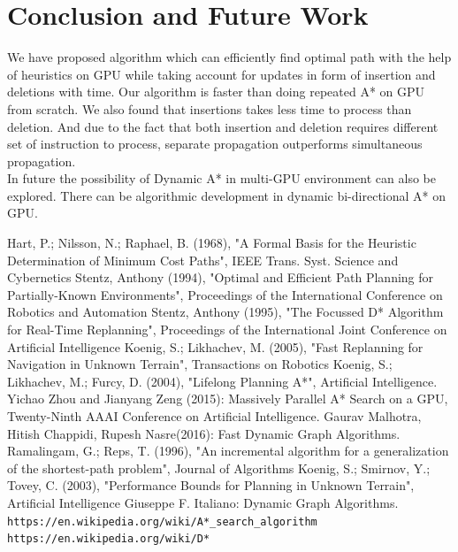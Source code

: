 \documentclass[a4paper]{article}
\begin{document}
\section{Conclusion and Future Work}
We have proposed algorithm which can efficiently find optimal path with the help of heuristics on GPU while taking account for updates in form of insertion and deletions with time. Our algorithm is faster than doing repeated A* on GPU from scratch. We also found that insertions takes less time to process than deletion. And due to the fact that both insertion and deletion requires different set of instruction to process, separate propagation outperforms simultaneous propagation.\\
In future the possibility of Dynamic A* in multi-GPU environment can also be explored. There can be algorithmic development in dynamic bi-directional A* on GPU. 
\begin{thebibliography}{} 
     Hart, P.; Nilsson, N.; Raphael, B. (1968), "A Formal Basis for the Heuristic Determination of Minimum Cost Paths", IEEE Trans. Syst. Science and Cybernetics
    Stentz, Anthony (1994), "Optimal and Efficient Path Planning for Partially-Known Environments", Proceedings of the International Conference on Robotics and Automation
    Stentz, Anthony (1995), "The Focussed D* Algorithm for Real-Time Replanning", Proceedings of the International Joint Conference on Artificial Intelligence
    Koenig, S.; Likhachev, M. (2005), "Fast Replanning for Navigation in Unknown Terrain", Transactions on Robotics
    Koenig, S.; Likhachev, M.; Furcy, D. (2004), "Lifelong Planning A*", Artificial Intelligence.
    Yichao Zhou and Jianyang Zeng (2015): Massively Parallel A* Search on a GPU, Twenty-Ninth AAAI Conference on Artificial Intelligence.
    Gaurav Malhotra, Hitish Chappidi, Rupesh Nasre(2016): Fast Dynamic Graph Algorithms.
     Ramalingam, G.; Reps, T. (1996), "An incremental algorithm for a generalization of the shortest-path problem", Journal of Algorithms
    Koenig, S.; Smirnov, Y.; Tovey, C. (2003), "Performance Bounds for Planning in Unknown Terrain", Artificial Intelligence
    Giuseppe F. Italiano: Dynamic Graph Algorithms.
    \texttt{https://en.wikipedia.org/wiki/A*\_search\_algorithm}
    \texttt{https://en.wikipedia.org/wiki/D*}
    
\end{thebibliography}
\end{document}
